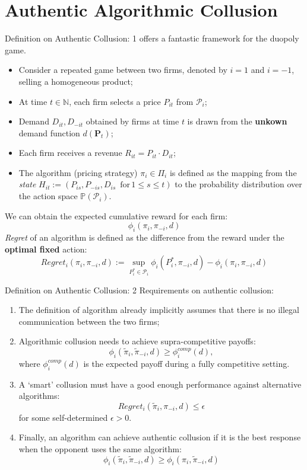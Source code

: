 \documentclass[8pt]{beamer}
\begin{document}
\section{Authentic Algorithmic Collusion}

\begin{frame}{Definition on Authentic Collusion: 1}
    \cite{den2023mathematical} offers a fantastic framework for the duopoly game.
    \begin{itemize}
        \item Consider a repeated game between two firms, denoted by $i = 1$ and $i = -1$, selling a homogeneous product;
        \item At time $t \in \mathbb{N}$, each firm selects a price $P_{it}$ from $\mathcal{P}_i$;
        \item Demand $D_{it}, D_{-it}$ obtained by firms at time $t$ is drawn from the \textbf{unkown} demand function $d(\mathbf{P}_t)$;
        \item Each firm receives a revenue $R_{it} = P_{it} \cdot D_{it}$;
        \item The algorithm (pricing strategy) $\pi_i\in \Pi_i$ is defined as the mapping from the \textit{state} $H_{it} := (P_{is}, P_{-is}, D_{is} \, \text{ for} \, 1 \leq s \leq t)$ to the probability distribution over the action space $\mathbb{P}(\mathcal{P}_i)$.
    \end{itemize}
    We can obtain the expected cumulative reward for each firm:
    \[
        \phi_i(\pi_i,\pi_{-i},d)
    \]
    \textit{Regret} of an algorithm is defined as the difference from the reward under the \textbf{optimal fixed} action:
    \[  
        Regret_i(\pi_i,\pi_{-i},d):=\sup_{P_i^*\in \mathcal{P}_i} \phi_i(P_i^*,\pi_{-i},d) - \phi_i(\pi_i,\pi_{-i},d)
    \]
\end{frame}

\begin{frame}{Definition on Authentic Collusion: 2}
    Requirements on authentic collusion:
    \begin{enumerate}
        \item The definition of algorithm already implicitly assumes that there is no illegal communication between the two firms;
        \item Algorithmic collusion needs to achieve supra-competitive payoffs:
        \[
            \phi_i(\tilde{\pi}_i, \tilde{\pi}_{-i}, d) \geq \phi_i^{comp}(d),
        \]
        where $\phi_i^{comp}(d)$ is the expected payoff during a fully competitive setting.
        \item A `smart' collusion must have a good enough performance against alternative algorithms:
        \[
            Regret_i(\tilde{\pi}_i, \pi_{-i}, d) \leq \epsilon
        \]
        for some self-determined $\epsilon>0$.
        \item Finally, an algorithm can achieve authentic collusion if it is the best response when the opponent uses the same algorithm:
        \[
            \phi_i(\tilde{\pi}_i, \tilde{\pi}_{-i}, d) \geq \phi_i(\pi_i, \tilde{\pi}_{-i}, d)
        \]
    \end{enumerate}
\end{frame}
\end{document}
